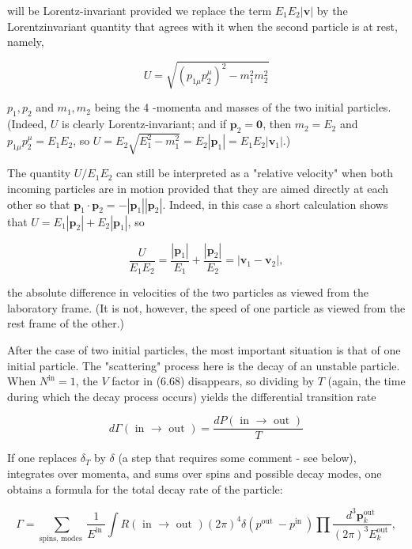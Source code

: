 \documentclass[10pt, letterpaper]{article}
\begin{document}
will be Lorentz-invariant provided we replace the term $E_{1} E_{2}|\mathbf{v}|$ by the Lorentzinvariant quantity that agrees with it when the second particle is at rest, namely,

$$
U=\sqrt{\left(p_{1 \mu} p_{2}^{\mu}\right)^{2}-m_{1}^{2} m_{2}^{2}}
$$

$p_{1}, p_{2}$ and $m_{1}, m_{2}$ being the 4 -momenta and masses of the two initial particles. (Indeed, $U$ is clearly Lorentz-invariant; and if $\mathbf{p}_{2}=\mathbf{0}$, then $m_{2}=E_{2}$ and $p_{1 \mu} p_{2}^{\mu}= E_{1} E_{2}$, so $U=E_{2} \sqrt{E_{1}^{2}-m_{1}^{2}}=E_{2}\left|\mathbf{p}_{1}\right|=E_{1} E_{2}\left|\mathbf{v}_{1}\right|$.)

The quantity $U / E_{1} E_{2}$ can still be interpreted as a "relative velocity" when both incoming particles are in motion provided that they are aimed directly at each other so that $\mathbf{p}_{1} \cdot \mathbf{p}_{2}=-\left|\mathbf{p}_{1}\right|\left|\mathbf{p}_{2}\right|$. Indeed, in this case a short calculation shows that $U=E_{1}\left|\mathbf{p}_{2}\right|+E_{2}\left|\mathbf{p}_{1}\right|$, so

$$
\frac{U}{E_{1} E_{2}}=\frac{\left|\mathbf{p}_{1}\right|}{E_{1}}+\frac{\left|\mathbf{p}_{2}\right|}{E_{2}}=\left|\mathbf{v}_{1}-\mathbf{v}_{2}\right|,
$$

the absolute difference in velocities of the two particles as viewed from the laboratory frame. (It is not, however, the speed of one particle as viewed from the rest frame of the other.)

After the case of two initial particles, the most important situation is that of one initial particle. The "scattering" process here is the decay of an unstable particle. When $N^{\mathrm{in}}=1$, the $V$ factor in (6.68) disappears, so dividing by $T$ (again, the time during which the decay process occurs) yields the differential transition rate

$$
d \Gamma(\text { in } \rightarrow \text { out })=\frac{d P(\text { in } \rightarrow \text { out })}{T}
$$

If one replaces $\delta_{T}$ by $\delta$ (a step that requires some comment - see below), integrates over momenta, and sums over spins and possible decay modes, one obtains a formula for the total decay rate of the particle:

$$
\Gamma=\sum_{\text {spins, modes }} \frac{1}{E^{\text {in }}} \int R(\text { in } \rightarrow \text { out })(2 \pi)^{4} \delta\left(p^{\text {out }}-p^{\text {in }}\right) \prod \frac{d^{3} \mathbf{p}_{k}^{\text {out }}}{(2 \pi)^{3} E_{k}^{\text {out }}},
$$
\end{document}
